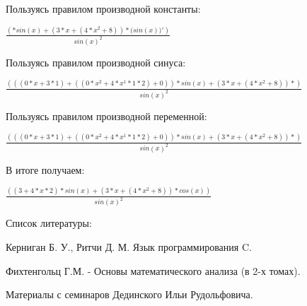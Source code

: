 \documentclass[a4paper,20pt]{article}
\begin{document}
{Пользуясь правилом производной константы:

${\frac{({*{sin({x})}}+{{({{3}*{x}}+{({{4}*{{x}^{2}}}+{8})})}*{(sin({x})})'})}{{sin({x})}^{2}}}$

Пользуясь правилом производной синуса:

${\frac{({{({({{0}*{x}}+{{3}*{1}})}+{({({{0}*{{x}^{2}}}+{{4}*{{{{x}^{1}}*{1}}*{2}}})}+{0})})}*{sin({x})}}+{{({{3}*{x}}+{({{4}*{{x}^{2}}}+{8})})}*})}{{sin({x})}^{2}}}$

Пользуясь правилом производной переменной:

${\frac{({{({({{0}*{x}}+{{3}*{1}})}+{({({{0}*{{x}^{2}}}+{{4}*{{{{x}^{1}}*{1}}*{2}}})}+{0})})}*{sin({x})}}+{{({{3}*{x}}+{({{4}*{{x}^{2}}}+{8})})}*})}{{sin({x})}^{2}}}$



В итоге получаем:

${\frac{({{({3}+{{4}*{{x}*{2}}})}*{sin({x})}}+{{({{3}*{x}}+{({{4}*{{x}^{2}}}+{8})})}*{cos({x})}})}{{sin({x})}^{2}}}$



Список литературы:

	Керниган Б. У., Ритчи Д. М. Язык программирования C.

	Фихтенгольц Г.М. - Основы математического анализа (в 2-х томах).

	Материалы с семинаров Дединского Ильи Рудольфовича.

	

}
\end{document}
